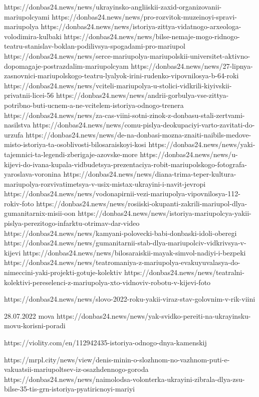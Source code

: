https://donbas24.news/news/ukrayinsko-angliiskii-zaxid-organizovanii-mariupolcyami
https://donbas24.news/news/pro-rozvitok-muzeinoyi-spravi-mariupolya
https://donbas24.news/news/istoriya-zittya-vidatnogo-arxeologa-volodimira-kulbaki
https://donbas24.news/news/bilse-nemaje-mogo-ridnogo-teatru-stanislav-boklan-podilivsya-spogadami-pro-mariupol
https://donbas24.news/news/serce-mariupolya-mariupolskii-universitet-aktivno-dopomagaje-postrazdalim-mariupolcyam
https://donbas24.news/news/27-lipnya-zasnovnici-mariupolskogo-teatru-lyalyok-irini-rudenko-vipovnilosya-b-64-roki
https://donbas24.news/news/vciteli-mariupolya-u-stolici-vidkrili-kiyivskii-privatnii-licei-56
https://donbas24.news/news/andrii-gorbulya-vse-zittya-potribno-buti-ucnem-a-ne-vcitelem-istoriya-odnogo-trenera
https://donbas24.news/news/za-cas-viini-sotni-zinok-z-donbasu-stali-zertvami-nasilstva
https://donbas24.news/news/comu-pislya-deokupaciyi-varto-zavitati-do-urzufa
https://donbas24.news/news/de-na-donbasi-mozna-znaiti-naibils-medove-misto-istoriya-ta-osoblivosti-bilosaraiskoyi-kosi
https://donbas24.news/news/yaki-tajemnici-ta-legendi-zberigaje-azovske-more
https://donbas24.news/news/u-kijevi-do-ivana-kupala-vidbudetsya-prezentaciya-robit-mariupolskogo-fotografa-yaroslava-voronina
https://donbas24.news/news/diana-trima-teper-kultura-mariupolya-rozvivatimetsya-v-usix-mistax-ukrayini-i-navit-jevropi
https://donbas24.news/news/vodonapirnii-vezi-mariupolya-vipovnilosya-112-rokiv-foto
https://donbas24.news/news/rosiiski-okupanti-zakrili-mariupol-dlya-gumanitarnix-misii-oon
https://donbas24.news/news/istoriya-mariupolcya-yakii-pislya-perezitogo-infarktu-otrimav-dar-video
https://donbas24.news/news/kamyani-polovecki-babi-donbaski-idoli-oberegi
https://donbas24.news/news/gumanitarnii-stab-dlya-mariupolciv-vidkrivsya-v-kijevi
https://donbas24.news/news/bilosaraiskii-mayak-simvol-nadiyi-i-bezpeki
https://donbas24.news/news/teatromaniya-z-mariupolya-evakuyuvalasya-do-nimeccini-yaki-projekti-gotuje-kolektiv
https://donbas24.news/news/teatralni-kolektivi-pereselenci-z-mariupolya-xto-vidnoviv-robotu-v-kijevi-foto

https://donbas24.news/news/slovo-2022-roku-yakii-viraz-stav-golovnim-v-rik-viini

28.07.2022 mova
https://donbas24.news/news/yak-svidko-pereiti-na-ukrayinsku-movu-korisni-poradi

https://violity.com/en/112942435-istoriya-odnogo-dnya-kamenskij

https://mrpl.city/news/view/denis-minin-o-slozhnom-no-vazhnom-puti-e-vakuatsii-mariupoltsev-iz-osazhdennogo-goroda
https://donbas24.news/news/naimolodsa-volonterka-ukrayini-zibrala-dlya-zsu-bilse-35-tis-grn-istoriya-pyatiricnoyi-mariyi

